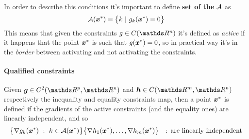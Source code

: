 	In order to describe this conditions it's important to define \textbf{set of the } $\mathcal A$ as
	\[ \mathcal A(\boldsymbol{x}^*) = \big\{ k \ | \ g_k(\boldsymbol{x}^*) = 0 \big\} \]
	This means that given the constraints $g\in C(\R^n)$ it's defined as \textit{active} if it happens that the point $\boldsymbol{x}^*$ is such that $g(\boldsymbol{x}^*) = 0$, so in practical way it's in the \textit{border} between activating and not activating the constraints.
	
	\paragraph{Qualified constraints} Given $\vett g \in C^2(\R^p,\R^n)$ and $\vett h \in C (\R^m,\R^n)$ respectively the inequality and equality constraints map, then a point $\boldsymbol{x}^*$ is defined  if the gradients of the active constraints (and the equality ones) are linearly independent, and so
	\[ \big\{ \nabla g_k(\boldsymbol{x}^*) \ : \ k \in \mathcal A(\boldsymbol{x}^*) \big\} \big\{ \nabla h_1(\boldsymbol{x}^*),\dots, \nabla h_m(\boldsymbol{x}^*) \big\} \quad \textrm{: are linearly independent} \]
	
